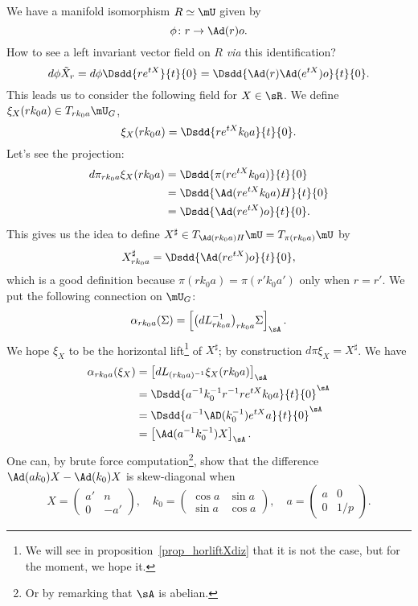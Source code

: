 We have a manifold isomorphism $R\simeq\mU$ given by
\[
	\phi\colon r\to \Ad(r)o.
\]
How to see a left invariant vector field on $R$ \emph{via} this identification?
\[
	d\phi\tilde X_r=d\phi\Dsdd{ r e^{tX} }{t}{0}
	=\Dsdd{ \Ad(r)\Ad( e^{tX})o }{t}{0}.
\]
This leads us to consider the following field for $X\in\sR$. We define $\xi_X(rk_0a)\in T_{rk_0a}\mU_G$,
\begin{equation}
	\xi_X(rk_0a)=\Dsdd{ r e^{tX}k_0a }{t}{0}.
\end{equation}
Let's see the projection:
\[
	\begin{split}
		d\pi_{rk_0a}\xi_X(rk_0a)&=\Dsdd{ \pi(r e^{tX}k_0a) }{t}{0}\\
		&=\Dsdd{ \Ad(r e^{tX}k_0a)H }{t}{0}\\
		&=\Dsdd{ \Ad(r e^{tX})o }{t}{0}.
	\end{split}
\]
This gives us the idea to define $X^{\sharp}\in T_{\Ad(rk_0a)H}\mU=T_{\pi(rk_0a)}\mU$ by
\begin{equation}
	X^{\sharp}_{rk_0a}=\Dsdd{ \Ad(re^{tX})o }{t}{0},
\end{equation}
which is a good definition because $\pi(rk_0a)=\pi(r'k_0a')$ only when $r=r'$. We put the following connection on $\mU_G$:
\begin{equation}
	\alpha_{rk_0a}(\Sigma)=\left[     \big( dL_{rk_0a}^{-1} \big)_{rk_0a}\Sigma    \right]_{\sA}.
\end{equation}
We hope $\xi_X$ to be the horizontal lift\footnote{We will see in proposition~\ref{prop_horliftXdiz} that it is not the case, but for the moment, we hope it.} of $X^{\sharp}$; by construction $d\pi\xi_X=X^{\sharp}$. We have
\[
	\begin{split}
		\alpha_{rk_0a}(\xi_X)&=\left[ dL_{(rk_0a)^{-1}}\xi_X(rk_0a) \right]_{\sA}\\
		&=\Dsdd{ a^{-1}k_0^{-1}r^{-1}r e^{tX}k_0a }{t}{0}^{\sA}\\
		&=\Dsdd{ a^{-1}\AD(k_0^{-1}) e^{tX}a}{t}{0}^{\sA}\\
		&=\left[ \Ad(a^{-1}k_0^{-1})X \right]_{\sA}.
	\end{split}
\]
One can, by brute force computation\footnote{Or by remarking that $\sA$ is abelian.}, show that the difference $\Ad(ak_0)X-\Ad(k_0)X$ is skew-diagonal when
\[
	X=\begin{pmatrix}
		a' & n \\0&-a'
	\end{pmatrix},
	\quad k_0=\begin{pmatrix}
		\cos a & \sin a \\\sin a&\cos a
	\end{pmatrix},
	\quad
	a=\begin{pmatrix}
		a & 0 \\0&1/p
	\end{pmatrix}.
\]
